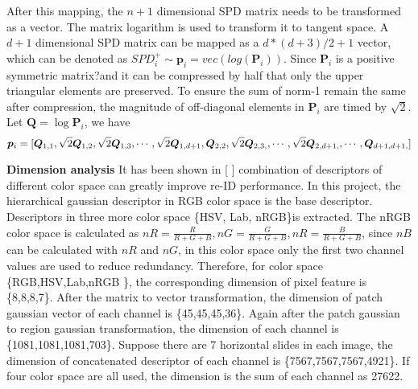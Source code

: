After this mapping, the $n+1$ dimensional SPD matrix needs to be transformed as a vector. The matrix logarithm is used to transform it to tangent space. A $d+1$ dimensional SPD matrix can be mapped as a $d*(d+3)/2+1$ vector, which can be denoted as $SPD_i^+ \sim \bm{p}_i = vec(log(\bm{P}_i))$. Since $\bm{P}_i$ is a positive symmetric matrix?and it can be compressed by half that only the upper triangular 
elements are preserved. To ensure the sum of norm-1 remain the same after compression, the magnitude of off-diagonal elements in $\bm{P}_i$ are timed by $\sqrt2$.  Let $\bm{Q}=\log{\bm{P}_i}$, we have
\begin{equation}
 \bm{p}_i = [\bm{Q}_{1,1},\sqrt2\bm{Q}_{1,2},\sqrt2\bm{Q}_{1,3},\cdots,\sqrt2\bm{Q}_{1,d+1},\\ 
 \bm{Q}_{2,2},\sqrt2\bm{Q}_{2,3,},\cdots,\sqrt2\bm{Q}_{2,d+1,},\cdots,\bm{Q}_{d+1,d+1,}]
\end{equation}

\textbf{Dimension analysis} It has been shown in [ ]  combination of descriptors of different color space can greatly improve re-ID performance. In this project, the hierarchical gaussian descriptor in RGB color space is the base descriptor. Descriptors in three more color space \{HSV, Lab, nRGB\}is extracted. The nRGB color space is calculated as $nR = \frac{R}{R+G+B},nG = \frac{G}{R+G+B},nR = \frac{B}{R+G+B}$, since $nB$ can be calculated with $nR$ and $nG$, in this color space only the first two channel values are used to reduce redundancy. Therefore, for color space \{RGB,HSV,Lab,nRGB \}, the corresponding dimension of pixel feature is \{8,8,8,7\}. After the matrix to vector transformation, the dimension of patch gaussian vector of each channel is \{45,45,45,36\}. Again after the patch gaussian to region gaussian transformation, the dimension of each channel is \{1081,1081,1081,703\}. Suppose there are 7 horizontal slides in each image, the dimension of concatenated descriptor of each channel is \{7567,7567,7567,4921\}. If four color space are all used, the dimension is the sum of each channel as 27622. 